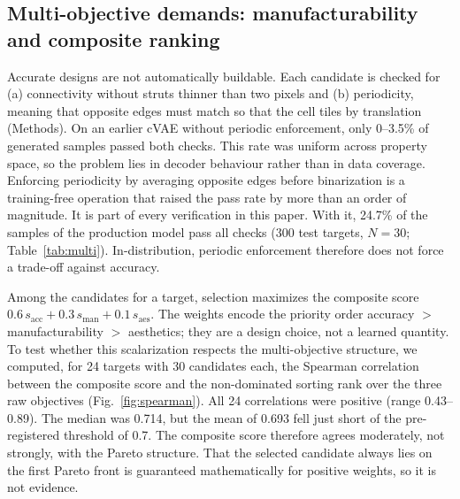 \documentclass[a4paper,11pt]{article}
\begin{document}
\subsection{Multi-objective demands: manufacturability and composite ranking}

Accurate designs are not automatically buildable. Each candidate is checked
for (a) connectivity without struts thinner than two pixels and (b)
periodicity, meaning that opposite edges must match so that the cell tiles
by translation (Methods). On an earlier cVAE without periodic enforcement,
only 0--3.5\% of generated samples passed both checks. This rate was uniform
across property space, so the problem lies in decoder behaviour rather than
in data coverage. Enforcing periodicity by averaging opposite edges before
binarization is a training-free operation that raised the pass rate by more
than an order of magnitude. It is part of every verification in this paper.
With it, 24.7\% of the samples of the production model pass all checks
(300 test targets, $N=30$; Table~\ref{tab:multi}). In-distribution,
periodic enforcement therefore does not force a trade-off against accuracy.

Among the candidates for a target, selection maximizes the composite score
$0.6\,s_{\mathrm{acc}}+0.3\,s_{\mathrm{man}}+0.1\,s_{\mathrm{aes}}$. The
weights encode the priority order accuracy $>$ manufacturability $>$
aesthetics; they are a design choice, not a learned quantity. To test
whether this scalarization respects the multi-objective structure, we
computed, for 24 targets with 30 candidates each, the Spearman correlation
between the composite score and the non-dominated sorting rank over the
three raw objectives (Fig.~\ref{fig:spearman}). All 24 correlations were
positive (range 0.43--0.89). The median was 0.714, but the mean of 0.693
fell just short of the pre-registered threshold of 0.7. The composite score
therefore agrees moderately, not strongly, with the Pareto structure. That
the selected candidate always lies on the first Pareto front is guaranteed
mathematically for positive weights, so it is not evidence.
\end{document}
